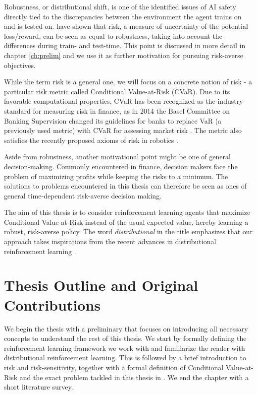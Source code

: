 Robustness, or distributional shift, is one of the identified issues of AI safety \citep{leike2017ai, amodei2016concrete} directly tied to the discrepancies between the environment the agent trains on and is tested on. \citet{chow2015risk} have shown that risk, a measure of uncertainty of the potential loss/reward, can be seen as equal to robustness, taking into account the differences during train- and test-time. This point is discussed in more detail in chapter \ref{ch:prelim} and we use it as further motivation for pursuing risk-averse objectives.

While the term risk is a general one, we will focus on a concrete notion of risk - a particular risk metric called Conditional Value-at-Risk (CVaR). 
Due to its favorable computational properties, CVaR has been recognized as the industry standard for measuring risk in finance, as in 2014 the Basel Committee on Banking Supervision changed its guidelines for banks to replace VaR (a previously used metric) with CVaR for assessing market risk \citep{basel2013fundamental}. The metric also satisfies the recently proposed axioms of risk in robotics \citep{majumdar2017should}.

Aside from robustness, another motivational point might be one of general decision-making. Commonly encountered in finance, decision makers face the problem of maximizing profits while keeping the risks to a minimum. The solutions to problems encountered in this thesis can therefore be seen as ones of general time-dependent risk-averse decision making.

The aim of this thesis is to consider reinforcement learning agents that maximize Conditional Value-at-Risk instead of the usual expected value, hereby learning a robust, risk-averse policy. The word \textit{distributional} in the title emphasizes that our approach takes inspirations from the recent advances in distributional reinforcement learning \citep{bellemare2017distributional, dabney2017distributional}.



\section{Thesis Outline and Original Contributions}

We begin the thesis with a preliminary  that focuses on introducing all necessary concepts to understand the rest of this thesis. We start by formally defining the reinforcement learning framework we work with and familiarize the reader with distributional reinforcement learning. This is followed by a brief introduction to risk and risk-sensitivity, together with a formal definition of Conditional Value-at-Risk and the exact problem tackled in this thesis in . We end the chapter with a short literature survey.

